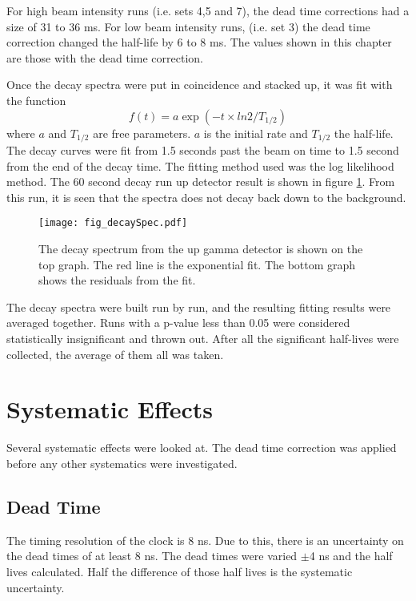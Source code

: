 \documentclass[MaxHughesThesis.tex]{subfiles}
\begin{document}
For high beam intensity runs (i.e. sets 4,5 and 7), the dead time corrections had a size of 31 to 36 ms.
For low beam intensity runs, (i.e. set 3) the dead time correction changed the half-life by 6 to 8 ms. 
The values shown in this chapter are those with the dead time correction.

Once the decay spectra were put in coincidence and stacked up, it was fit with the function
%
\begin{equation}
	f(t) = a\exp{(-t \times ln2/T_{1/2})}
	\label{eq:fit-function}
\end{equation}
%
where $a$ and $T_{1/2}$ are free parameters.
$a$ is the initial rate and $T_{1/2}$ the half-life.
The decay curves were fit from 1.5 seconds past the beam on time to 1.5 second from the end of the decay time. 
The fitting method used was the log likelihood method. 
The 60 second decay run up detector result is shown in figure \ref{fig:60secdecay}.
From this run, it is seen that the spectra does not decay back down to the background. 

\begin{figure}[!htb]
\centerline{\texttt{[image: fig\_decaySpec.pdf]}}
\caption{The decay spectrum from the up gamma detector is shown on the top graph.
	The red line is the exponential fit. 
	The bottom graph shows the residuals from the fit. 
	}
\label{fig:60secdecay}
\end{figure}


The decay spectra were built run by run, and the resulting fitting results were averaged together. 
Runs with a p-value less than 0.05 were considered statistically insignificant and thrown out.
After all the significant half-lives were collected, the average of them all was taken.

\section{Systematic Effects}
Several systematic effects were looked at.
The dead time correction was applied before any other systematics were investigated. 

\subsection{Dead Time}
The timing resolution of the clock is 8 ns.
Due to this, there is an uncertainty on the dead times of at least 8 ns.
The dead times were varied $\pm$4 ns and the half lives calculated.
Half the difference of those half lives is the systematic uncertainty.
\end{document}
